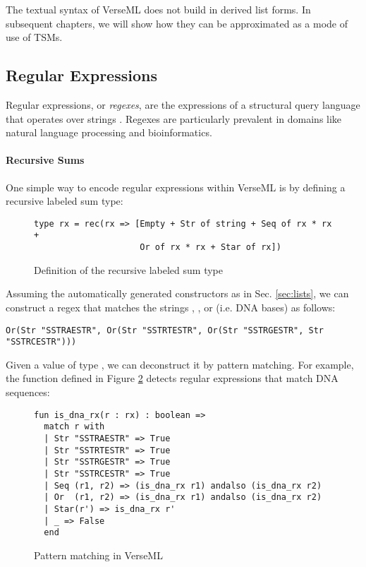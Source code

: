 The textual syntax of VerseML does not build in derived list forms. In subsequent chapters, we will show how they can be approximated as a mode of use of TSMs.

\subsection{Regular Expressions}\label{sec:syntax-examples-regexps}
Regular expressions, or \emph{regexes}, are the expressions of a structural query language that operates over strings \cite{Thompson:1968:PTR:363347.363387}. Regexes are particularly prevalent in domains like natural language processing and bioinformatics.

\paragraph{Recursive Sums}
One simple way to encode regular expressions within VerseML is by defining a recursive labeled sum type:

\begin{figure}[ht]
\begin{lstlisting}[numbers=none]
type rx = rec(rx => [Empty + Str of string + Seq of rx * rx +
                     Or of rx * rx + Star of rx])
\end{lstlisting}
\caption{Definition of the recursive labeled sum type }
\label{fig:datatype-rx}
\end{figure}
Assuming the automatically generated constructors as in Sec. \ref{sec:lists}, we can construct a regex that matches the strings , ,  or  (i.e. DNA bases) as follows:
\begin{lstlisting}[numbers=none]
Or(Str "SSTRAESTR", Or(Str "SSTRTESTR", Or(Str "SSTRGESTR", Str "SSTRCESTR")))
\end{lstlisting}

Given a value of type , we can deconstruct it by pattern matching. For example, the function  defined in Figure \ref{fig:is_dna_rx} detects regular expressions that match DNA sequences:

\begin{figure}
\begin{lstlisting}[numbers=none]
fun is_dna_rx(r : rx) : boolean => 
  match r with 
  | Str "SSTRAESTR" => True
  | Str "SSTRTESTR" => True
  | Str "SSTRGESTR" => True
  | Str "SSTRCESTR" => True
  | Seq (r1, r2) => (is_dna_rx r1) andalso (is_dna_rx r2)
  | Or  (r1, r2) => (is_dna_rx r1) andalso (is_dna_rx r2)
  | Star(r') => is_dna_rx r'
  | _ => False 
  end
\end{lstlisting}
\caption{Pattern matching in VerseML}
\label{fig:is_dna_rx}
\end{figure}


